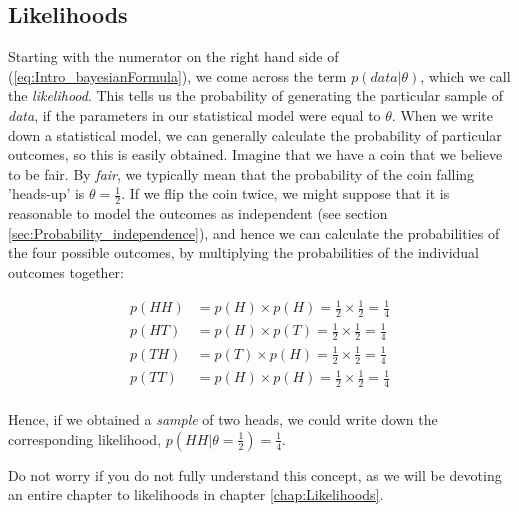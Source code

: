\documentclass[11pt,fullpage]{book}
\begin{document}
\subsection{Likelihoods}\label{sec:Intro_likelihoods}
Starting with the numerator on the right hand side of (\ref{eq:Intro_bayesianFormula}), we come across the term $p(data|\theta)$, which we call the \textit{likelihood}. This tells us the probability of generating the particular sample of \textit{data}, if the parameters in our statistical model were equal to $\theta$. When we write down a statistical model, we can generally calculate the probability of particular outcomes, so this is easily obtained. Imagine that we have a coin that we believe to be fair. By \textit{fair}, we typically mean that the probability of the coin falling 'heads-up' is $\theta=\frac{1}{2}$. If we flip the coin twice, we might suppose that it is reasonable to model the outcomes as independent (see section \ref{sec:Probability_independence}), and hence we can calculate the probabilities of the four possible outcomes, by multiplying the probabilities of the individual outcomes together:

\begin{equation}
\begin{align}
p(HH) &= p(H)\times p(H) = \frac{1}{2} \times \frac{1}{2} = \frac{1}{4}\\
p(HT) &= p(H)\times p(T) = \frac{1}{2} \times \frac{1}{2} = \frac{1}{4}\\
p(TH) &= p(T)\times p(H) = \frac{1}{2} \times \frac{1}{2} = \frac{1}{4}\\
p(TT) &= p(H)\times p(H) = \frac{1}{2} \times \frac{1}{2} = \frac{1}{4}\\
\end{align}
\end{equation}

Hence, if we obtained a \textit{sample} of two heads, we could write down the corresponding likelihood, $p(HH|\theta=\frac{1}{2})=\frac{1}{4}$.

Do not worry if you do not fully understand this concept, as we will be devoting an entire chapter to likelihoods in chapter \ref{chap:Likelihoods}.
\end{document}

